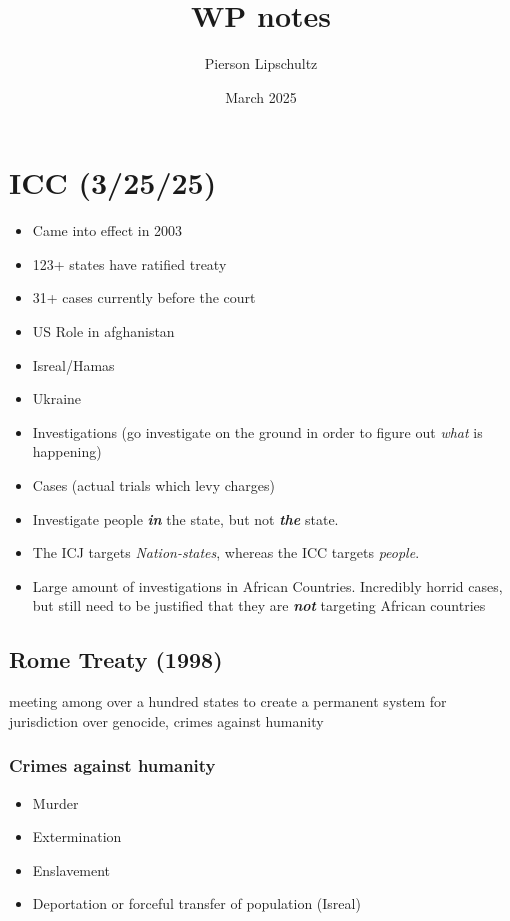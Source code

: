 \documentclass{article}
\title{WP notes}
\author{Pierson Lipschultz}
\date{March 2025}
\begin{document}
        
        

        
\section{ICC (3/25/25)}

\begin{itemize}
    \item Came into effect in 2003
    \item 123+ states have ratified treaty
    \item 31+ cases currently before the court
    \item US Role in afghanistan
    \item Isreal/Hamas
    \item Ukraine 
\end{itemize}
\begin{itemize}
    \item Investigations (go investigate on the ground in order to figure out \textit{what} is happening)
    \item Cases (actual trials which levy charges)
    \item Investigate people \textit{\textbf{in}} the state, but not \textit{\textbf{the}} state.
    \item The ICJ targets \textit{Nation-states}, whereas the ICC targets \textit{people}.
    \item Large amount of investigations in African Countries. Incredibly horrid cases, but still need to be justified that they are \textit{\textbf{not}} targeting African countries
\end{itemize}


\subsection{Rome Treaty (1998)}
meeting among over a hundred states to create a permanent system for jurisdiction over genocide, crimes against humanity

\subsubsection{Crimes against humanity}
\begin{itemize}
    \item Murder
    \item Extermination
    \item Enslavement
    \item Deportation or forceful transfer of population (Isreal)
\end{itemize}
\end{document}
